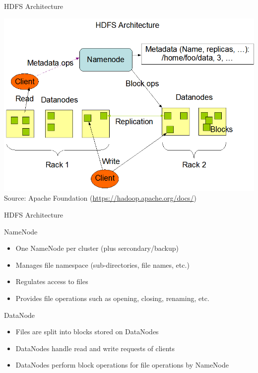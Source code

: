 \documentclass[ignorenonframetext,xcolor=x11names]{beamer}
\begin{document}
\begin{frame}{HDFS Architecture}
\centering

\includegraphics[width=\textwidth]{hdfsarchitecture.png}
\scriptsize Source: Apache Foundation (\url{https://hadoop.apache.org/docs/})
\end{frame}

\begin{frame}{HDFS Architecture}
\begin{block}{NameNode}
\begin{itemize}
    \item One NameNode per cluster (plus sercondary/backup)
    \item Manages file namespace (sub-directories, file names, etc.)
    \item Regulates access to files
    \item Provides file operations such as opening, closing, renaming, etc.
\end{itemize}
\end{block}

\begin{block}{DataNode}
\begin{itemize}
   \item Files are split into blocks stored on DataNodes
   \item DataNodes handle read and write requests of clients
   \item DataNodes perform block operations for file operations by NameNode
\end{itemize}
\end{block}
\end{frame}

   
\end{document}

